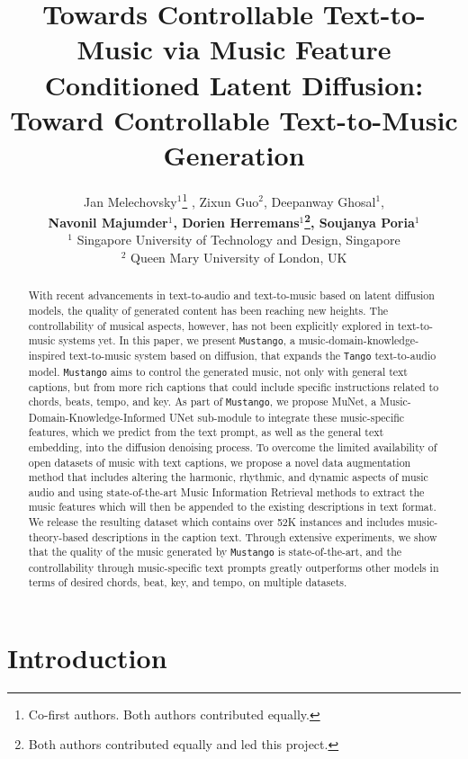 \documentclass[11pt]{article}
\title{Towards Controllable Text-to-Music via Music Feature Conditioned Latent Diffusion}
\title{\model{}: Toward Controllable Text-to-Music Generation}
\author{Jan Melechovsky$^1$\thanks{\hspace{0.2cm} Co-first authors. Both authors contributed equally.} ,
  Zixun Guo$^2$\footnotemark[1] ,
  Deepanway Ghosal$^1$, \\
  \textbf{Navonil Majumder$^1$,
  Dorien Herremans$^1$\thanks{\hspace{0.2cm} Both authors contributed equally and led this project.},
  Soujanya Poria$^1$\footnotemark[2]}
  \\
  $^1$ Singapore University of Technology and Design, Singapore\\
  $^2$ Queen Mary University of London, UK
}
\newcommand{\model}{\texttt{Mustango}}
\begin{document}
\maketitle
{}
\begin{abstract}


With recent advancements in text-to-audio and text-to-music based on latent diffusion models, the quality of generated content has been reaching new heights. The controllability of musical aspects, however, has not been explicitly explored in text-to-music systems yet.
In this paper, we present \model{}, a music-domain-knowledge-inspired text-to-music system based on diffusion, that expands the \texttt{Tango} text-to-audio model. \model{} aims to control the generated music, not only with general text captions, but from more rich captions that could include specific instructions related to chords, beats, tempo, and key. 
As part of \model{}, we propose MuNet, a Music-Domain-Knowledge-Informed UNet sub-module to integrate these music-specific features, which we predict from the text prompt, as well as the general text embedding, into the diffusion denoising process. 
To overcome the limited availability of open datasets of music with text captions, we propose a novel data augmentation method that includes altering the harmonic, rhythmic, and dynamic aspects of music audio and using state-of-the-art Music Information Retrieval methods to extract the music features which will then be appended to the existing descriptions in text format. We release the resulting \dataset{} dataset which contains over 52K instances and includes music-theory-based descriptions in the caption text. 
Through extensive experiments, we show that the quality of the music generated by \model{} is state-of-the-art, and the controllability through music-specific text prompts greatly outperforms other models in terms of desired chords, beat, key, and tempo, on multiple datasets. 
\end{abstract}

\section{Introduction}
\label{sec:intro}
\end{document}
